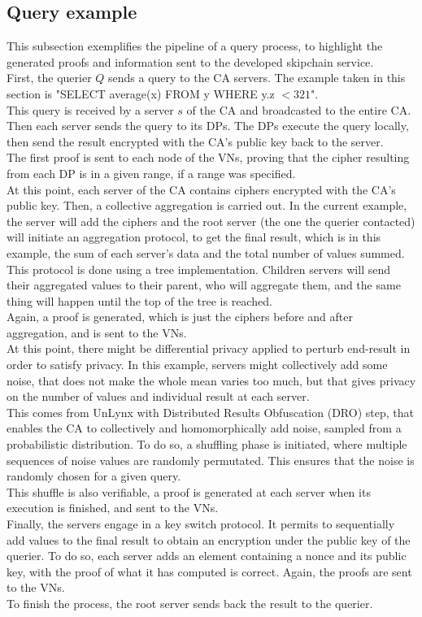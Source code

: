 \documentclass{article}
\begin{document}
\subsection{Query example}
This subsection exemplifies the pipeline of a query process, to highlight the generated proofs and information sent to the developed skipchain service.\\
First, the querier $Q$ sends a query to the CA servers. The example taken in this section is "SELECT average(x) FROM y WHERE y.z $< 321$".\\
This query is received by a server $s$ of the CA and broadcasted to the entire CA. Then each server sends the query to its DPs. The DPs execute the query locally, then send the result encrypted with the CA's public key back to the server.\\
The first proof is sent to each node of the VNs, proving that the cipher resulting from each DP is in a given range, if a range was specified.\\
At this point, each server of the CA contains ciphers encrypted with the CA's public key.
Then, a collective aggregation is carried out. In the current example, the server will add the ciphers and the root server (the one the querier contacted) will initiate an aggregation protocol, to get the final result, which is in this example, the sum of each server's data and the total number of values summed. This protocol is done using a tree implementation. Children servers will send their aggregated values to their parent, who will aggregate them, and the same thing will happen until the top of the tree is reached.\\
Again, a proof is generated, which is just the ciphers before and after aggregation, and is sent to the VNs.\\
At this point, there might be differential privacy applied to perturb end-result in order to satisfy privacy. In this example, servers might collectively add some noise, that does not make the whole mean varies too much, but that gives privacy on the number of values and individual result at each server.\\
This comes from UnLynx with Distributed Results Obfuscation (DRO) step, that enables the CA to collectively and homomorphically add noise, sampled from a probabilistic distribution.
To do so, a shuffling phase is initiated, where multiple sequences of noise values are randomly permutated. This ensures that the noise is randomly chosen for a given query.\\
This shuffle is also verifiable, a proof is generated at each server when its execution is finished, and sent to the VNs.\\
Finally, the servers engage in a key switch protocol. It permits to sequentially add values to the final result to obtain an encryption  under the public key of the querier. To do so, each server adds an element containing a nonce and its public key, with the proof of what it has computed is correct. Again, the proofs are sent to the VNs.\\
To finish the process, the root server sends back the result to the querier.\\
\end{document}

